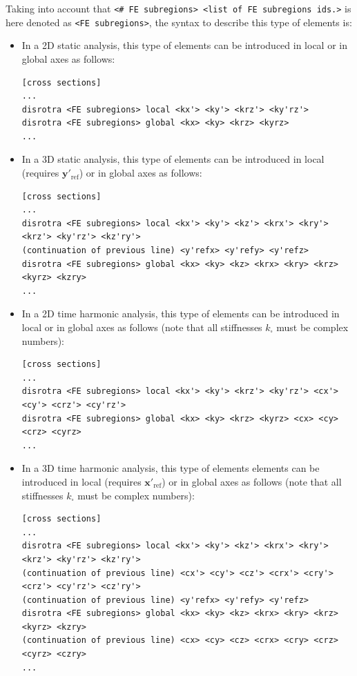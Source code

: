 \documentclass[a4paper,fleqn]{book}
\begin{document}
Taking into account that \texttt{<\# FE subregions> <list of FE subregions ids.>} is here denoted as \texttt{<FE subregions>}, the syntax to describe this type of elements is:
\begin{itemize}
\item In a 2D static analysis, this type of elements can be introduced in local or in global axes as follows:
\begin{Verbatim}[frame=single, fontsize=\small, label={format of section [cross sections] for disrotra elements}]
[cross sections]
...
disrotra <FE subregions> local <kx'> <ky'> <krz'> <ky'rz'>
disrotra <FE subregions> global <kx> <ky> <krz> <kyrz>
...
\end{Verbatim}  

\item In a 3D static analysis, this type of elements can be introduced in local (requires $\mathbf{y}'_\mathrm{ref}$) or in global axes as follows:
\begin{Verbatim}[frame=single, fontsize=\footnotesize, label={format of section [cross sections] for disrotra elements}]
[cross sections]
...
disrotra <FE subregions> local <kx'> <ky'> <kz'> <krx'> <kry'> <krz'> <ky'rz'> <kz'ry'> 
(continuation of previous line) <y'refx> <y'refy> <y'refz> 
disrotra <FE subregions> global <kx> <ky> <kz> <krx> <kry> <krz> <kyrz> <kzry>
...
\end{Verbatim}

\item In a 2D time harmonic analysis, this type of elements can be introduced in local or in global axes as follows (note that all stiffnesses $k_\square$ must be complex numbers):
\begin{Verbatim}[frame=single, fontsize=\small, label={format of section [cross sections] for disrotra elements}]
[cross sections]
...
disrotra <FE subregions> local <kx'> <ky'> <krz'> <ky'rz'> <cx'> <cy'> <crz'> <cy'rz'>
disrotra <FE subregions> global <kx> <ky> <krz> <kyrz> <cx> <cy> <crz> <cyrz>
...
\end{Verbatim} 

\item In a 3D time harmonic analysis, this type of elements elements can be introduced in local (requires $\mathbf{x}'_\mathrm{ref}$) or in global axes as follows (note that all stiffnesses $k_\square$ must be complex numbers):
\begin{Verbatim}[frame=single, fontsize=\footnotesize, label={format of section [cross sections] for disrotra elements}]
[cross sections]
...
disrotra <FE subregions> local <kx'> <ky'> <kz'> <krx'> <kry'> <krz'> <ky'rz'> <kz'ry'> 
(continuation of previous line) <cx'> <cy'> <cz'> <crx'> <cry'> <crz'> <cy'rz'> <cz'ry'> 
(continuation of previous line) <y'refx> <y'refy> <y'refz>
disrotra <FE subregions> global <kx> <ky> <kz> <krx> <kry> <krz> <kyrz> <kzry> 
(continuation of previous line) <cx> <cy> <cz> <crx> <cry> <crz> <cyrz> <czry>
...
\end{Verbatim}

\end{itemize}
\end{document}
